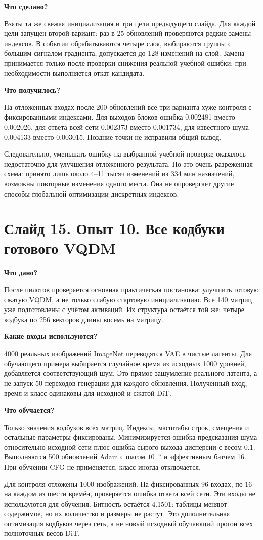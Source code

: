 \documentclass[a4paper,11pt]{article}
\newcommand{\slide}[2]{\clearpage\section*{Слайд #1. #2}}
\newcommand{\question}[1]{\par\textbf{#1}\par}
\begin{document}
\question{Что сделано?}
Взяты та же свежая инициализация и три цели предыдущего слайда.
Для каждой цели запущен второй вариант: раз в 25 обновлений проверяются
редкие замены индексов. В событии обрабатываются четыре слоя,
выбираются группы с большим сигналом градиента, допускается до 128
изменений на слой. Замена принимается только после проверки снижения
реальной учебной ошибки; при необходимости выполняется откат кандидата.

\question{Что получилось?}
На отложенных входах после 200 обновлений все три варианта хуже контроля
с фиксированными индексами. Для выходов блоков ошибка 0.002481 вместо
0.002026, для ответа всей сети 0.002373 вместо 0.001734, для известного
шума 0.004133 вместо 0.003015. Поздние точки не исправили общий вывод.

Следовательно, уменьшать ошибку на выбранной учебной проверке оказалось
недостаточно для улучшения отложенного результата. Но это очень разреженная
схема: принято лишь около 4--11 тысяч изменений из 334 млн назначений,
возможны повторные изменения одного места. Она не опровергает другие
способы глобальной оптимизации дискретных индексов.

\slide{15}{Опыт 10. Все кодбуки готового VQDM}
\question{Что дано?}
После пилотов проверяется основная практическая постановка: улучшить
готовую сжатую VQDM, а не только слабую стартовую инициализацию.
Все 140 матриц уже подготовлены с учётом активаций. Их структура остаётся
той же: четыре кодбука по 256 векторов длины восемь на матрицу.

\question{Какие входы используются?}
4000 реальных изображений ImageNet переводятся VAE в чистые латенты.
Для обучающего примера выбирается случайное время из исходных 1000
уровней, добавляется соответствующий шум. Это прямое зашумление реального
латента, а не запуск 50 переходов генерации для каждого обновления.
Полученный вход, время и класс одинаковы для исходной и сжатой DiT.

\question{Что обучается?}
Только значения кодбуков всех матриц. Индексы, масштабы строк, смещения
и остальные параметры фиксированы. Минимизируется ошибка предсказания шума
относительно исходной сети плюс ошибка сырого выхода дисперсии с весом 0.1.
Выполняются 500 обновлений Adam с шагом $10^{-5}$ и эффективным батчем 16.
При обучении CFG не применяется, класс иногда отключается.

Для контроля отложены 1000 изображений. На фиксированных 96 входах,
по 16 на каждом из шести времён, проверяется ошибка ответа всей сети.
Эти входы не используются для обучения. Битность остаётся 4.1501:
таблицы меняют содержимое, но их количество и размеры не растут.
Это дополнительная оптимизация кодбуков через сеть, а не новый исходный
обучающий прогон всех полноточных весов DiT.
\end{document}

